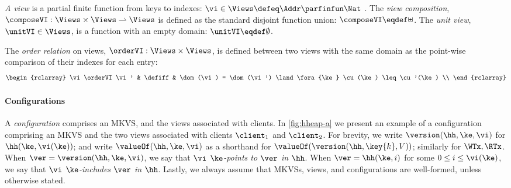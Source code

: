 \begin{definition}[Views]
\label{def:view}
\label{def:cuts}
\label{def:views}
\emph{A view} is a partial finite function from keys to indexes:
$
\vi \in \Views \defeq \Addr \parfinfun \Nat 
$ .                                                                 
The \emph{view composition}, $\composeVI: \Views \times \Views \rightharpoonup \Views$ is defined as the standard disjoint function union: $\composeVI \eqdef \uplus$. 
The \emph{unit view}, $\unitVI \in \Views$, is a function with an empty domain: $\unitVI \eqdef \emptyset$. 

The \emph{order relation} on views, $\orderVI: \Views \times \Views$, is defined between two views with the same domain as the point-wise comparison of their indexes for each entry: 
\[
\begin{rclarray}
    \vi \orderVI \vi' & \defiff & \dom(\vi) = \dom(\vi') \land \fora{\ke} \cu(\ke) \leq \cu'(\ke) \\
\end{rclarray}
\]
\end{definition}

\paragraph{Configurations} A \emph{configuration} comprises an MKVS, and the views associated with clients.
In \cref{fig:hheap-a} we present an example of a configuration comprising an MKVS and the two views associated with clients $\client_1$ and $\client_2$. 
For brevity, we write $\version(\hh, \ke, \vi)$ for $\hh(\ke, \vi(\ke))$; 
and write $\valueOf(\hh, \ke, \vi)$ as a shorthand for $ \valueOf(\version(\hh, \key{k}, V))$; similarly for $\WTx, \RTx$.
When $\ver = \version(\hh, \ke, \vi)$, we say that \emph{$\vi$ $\ke$-points to $\ver$ in $\hh$}. 
When $\ver = \hh(\ke, i)$ for some $0 \leq i \le \vi(\ke)$, we say that \emph{$\vi$ $\ke$-includes $\ver$ in $\hh$}.
Lastly, we always assume that MKVSs, views, and configurations are well-formed, unless otherwise stated.


